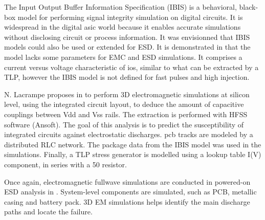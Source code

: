 The Input Output Buffer Information Specification (IBIS) \cite{ibis-spec} is a behavioral, black-box model for performing signal integrity simulation on digital circuits.
It is widespread in the digital \gls{asic} world because it enables accurate simulations without disclosing circuit or process information.
It was envisionned that IBIS models could also be used or extended for ESD.
It is demonstrated in \cite{ibisImprovementFabrice} that the model lacks some parameters for EMC and ESD simulations.
It comprises a current versus voltage characteristic of \gls{io}s, similar to what can be extracted by a TLP, however the IBIS model is not defined for fast pulses and high injection.

N. Lacrampe proposes in \cite{LacrampeTransientImmunity} to perform 3D electromagnetic simulations at silicon level, using the integrated circuit layout, to deduce the amount of capacitive couplings between Vdd and Vss rails.
The extraction is performed with HFSS software (Ansoft).
The goal of this analysis is to predict the susceptibility of integrated circuits against electrostatic discharges.
\gls{pcb} tracks are modeled by a distributed RLC network.
The package data from the IBIS model \cite{ibis-spec} was used in the simulations.
Finally, a TLP stress generator is modelled using a lookup table I(V) component, in series with a 50\textOmega{} resistor.

Once again, electromagnetic fullwave simulations are conducted in powered-on ESD analysis in \cite{softFailMobile}.
System-level components are simulated, such as PCB, metallic casing and battery pack.
3D EM simulations helps identify the main discharge paths and locate the failure.
